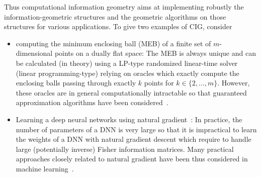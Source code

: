 \documentclass[11pt]{article}
\begin{document}
Thus computational information geometry aims at implementing robustly the information-geometric structures and the geometric algorithms on those structures for various applications. To give  two  examples of CIG, consider 
\begin{itemize}
\item 
 computing the minimum enclosing ball (MEB) of a finite set of $m$-dimensional points on a dually flat space:
The MEB is always unique and can be  calculated (in theory) using a LP-type 
  randomized  linear-time solver~\cite{MEBB-2008} (linear programming-type) relying on oracles which exactly compute the enclosing balls passing through exactly $k$ points for $k\in\{2,\ldots, m\}$. However, these oracles are in general computationally intractable so that guaranteed approximation algorithms have been considered~\cite{MEB-2005}.
  
  \item Learning a deep neural networks using natural gradient~\cite{NatGrad-1998,DNN-Calin2020}: In practice, the number of parameters of a DNN is very large so that it is impractical to learn the weights of a DNN with natural gradient descent which require to handle large (potentially inverse) Fisher information matrices. Many practical approaches closely related to natural gradient have been thus considered in machine learning~\cite{NatGrad-Martens-2020,RFIM-2017,StructureNatGrad-2021}.

  \end{itemize}
  
 


\maketitle
 



\end{document}
